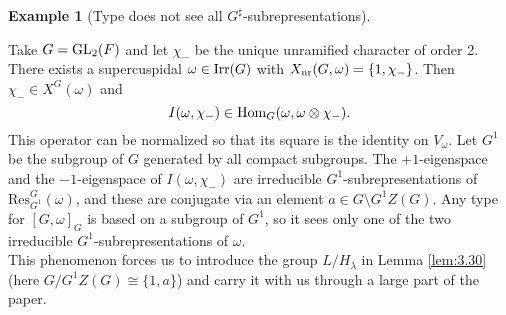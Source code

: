 \documentclass[11pt]{amsart}
\theoremstyle{definition}
\newtheorem{ex}[thm]{Example}
\begin{document}
\begin{ex}[Type does not see all $G^\sharp$-subrepresentations] 
\ \label{ex:5.1}

Take $G = {{\rm GL}}_2 (F)$ and let $\chi_-$ be the unique unramified character 
of order 2. There exists a supercuspidal $\omega \in {{\rm Irr}} (G)$ with
$X_{{\rm nr}} (G,\omega) = \{1,\chi_-\}$. Then $\chi_- \in X^G (\omega)$ and
\[
I(\omega,\chi_-) \in {{\rm Hom}}_G (\omega,\omega \otimes \chi_-).
\] 
This operator can be normalized so that its square is the identity on 
$V_\omega$. Let $G^1$ be the subgroup of $G$ generated by all compact
subgroups. The $+1$-eigenspace and the $-1$-eigenspace of 
$I(\omega,\chi_-)$ are irreducible $G^1$-subrepresentations of
$\mathrm{Res}^G_{G^1}(\omega)$, and these are conjugate via an element
$a \in G \setminus G^1 Z(G)$. 
Any type for $[G,\omega]_G$ is based on a subgroup of $G^1$, so it sees
only one of the two irreducible $G^1$-subrepresentations of $\omega$. \\
This phenomenon forces us to introduce the group $L / H_\lambda$ in Lemma
\ref{lem:3.30} (here $G / G^1 Z(G) \cong \{1,a\}$) and carry it with us 
through a large part of the paper.
\end{ex}
\end{document}
